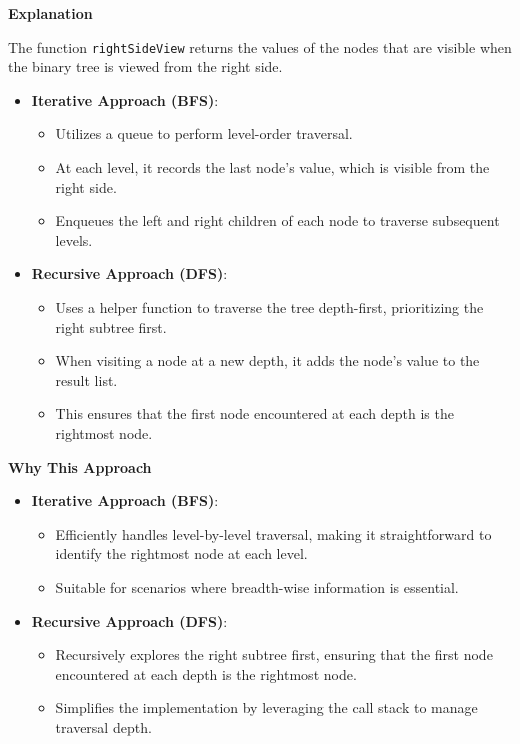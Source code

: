 \textbf{Explanation}

The function \texttt{rightSideView} returns the values of the nodes that are visible when the binary tree is viewed from the right side. 

\begin{itemize}
    \item \textbf{Iterative Approach (BFS)}: 
    \begin{itemize}
        \item Utilizes a queue to perform level-order traversal.
        \item At each level, it records the last node's value, which is visible from the right side.
        \item Enqueues the left and right children of each node to traverse subsequent levels.
    \end{itemize}
    
    \item \textbf{Recursive Approach (DFS)}: 
    \begin{itemize}
        \item Uses a helper function to traverse the tree depth-first, prioritizing the right subtree first.
        \item When visiting a node at a new depth, it adds the node's value to the result list.
        \item This ensures that the first node encountered at each depth is the rightmost node.
    \end{itemize}
\end{itemize}

\textbf{Why This Approach}

\begin{itemize}
    \item \textbf{Iterative Approach (BFS)}: 
    \begin{itemize}
        \item Efficiently handles level-by-level traversal, making it straightforward to identify the rightmost node at each level.
        \item Suitable for scenarios where breadth-wise information is essential.
    \end{itemize}
    
    \item \textbf{Recursive Approach (DFS)}: 
    \begin{itemize}
        \item Recursively explores the right subtree first, ensuring that the first node encountered at each depth is the rightmost node.
        \item Simplifies the implementation by leveraging the call stack to manage traversal depth.
    \end{itemize}
\end{itemize}

